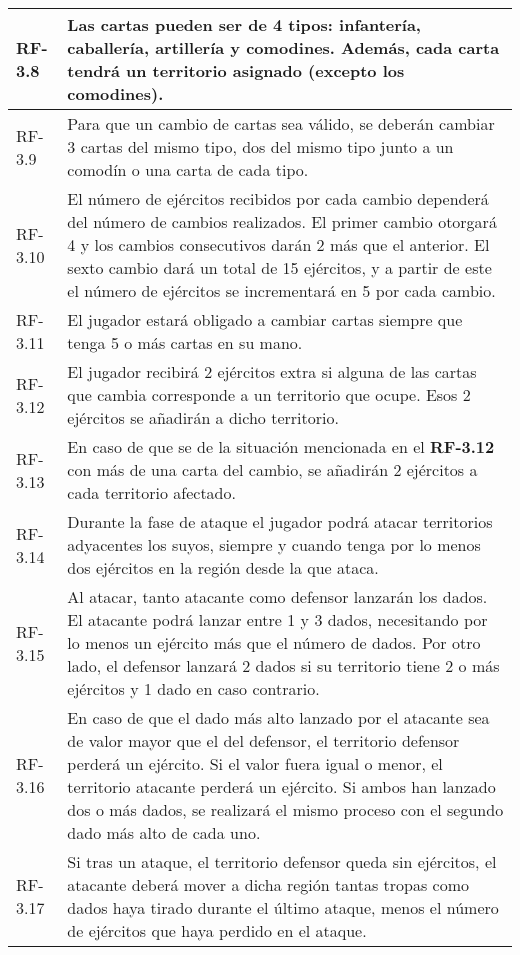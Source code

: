 \documentclass[11pt, a4paper, titlepage]{article}
\begin{document}
\begin{longtable}[h!]{| p{} | p{} |}
         \hline
         RF-3.8 & Las cartas pueden ser de 4 tipos: infantería, caballería, artillería y comodines.
         Además, cada carta tendrá un territorio asignado (excepto los comodines).\\
         \hline
         RF-3.9 & Para que un cambio de cartas sea válido, se deberán cambiar 3 cartas del mismo tipo, dos del mismo tipo junto a un comodín o una carta de cada tipo. \\
         \hline
         RF-3.10 & El número de ejércitos recibidos por cada cambio dependerá del número de cambios realizados. El primer cambio otorgará 4 y los cambios consecutivos darán 2 más que el anterior. El sexto cambio dará un total de 15 ejércitos, y a partir de este el número de ejércitos se incrementará en 5 por cada cambio. \\
         \hline
         RF-3.11 & El jugador estará obligado a cambiar cartas siempre que tenga 5 o más cartas en su mano. \\
         \hline
         RF-3.12 & El jugador recibirá 2 ejércitos extra si alguna de las cartas que cambia corresponde a un territorio que ocupe. Esos 2 ejércitos se añadirán a dicho territorio. \\
         \hline
         RF-3.13 & En caso de que se de la situación mencionada en el \textbf{RF-3.12} con más de una carta del cambio, se añadirán 2 ejércitos a cada territorio afectado. \\
         \hline
         RF-3.14 & Durante la fase de ataque el jugador podrá atacar territorios adyacentes los suyos, siempre y cuando tenga por lo menos dos ejércitos en la región desde la que ataca.\\
         \hline
         RF-3.15 & Al atacar, tanto atacante como defensor lanzarán los dados. El atacante podrá lanzar entre 1 y 3 dados, necesitando por lo menos un ejército más que el número de dados. Por otro lado, el defensor lanzará 2 dados si su territorio tiene 2 o más ejércitos y 1 dado en caso contrario.\\
         \hline
         RF-3.16 & En caso de que el dado más alto lanzado por el atacante sea de valor mayor que el del defensor, el territorio defensor perderá un ejército. Si el valor fuera igual o menor, el territorio atacante perderá un ejército. Si ambos han lanzado dos o más dados, se realizará el mismo proceso con el segundo dado más alto de cada uno.\\
         \hline
         RF-3.17 & Si tras un ataque, el territorio defensor queda sin ejércitos, el atacante deberá mover a dicha región tantas tropas como dados haya tirado durante el último ataque, menos el número de ejércitos que haya perdido en el ataque. \\

\end{longtable}
\end{document}
